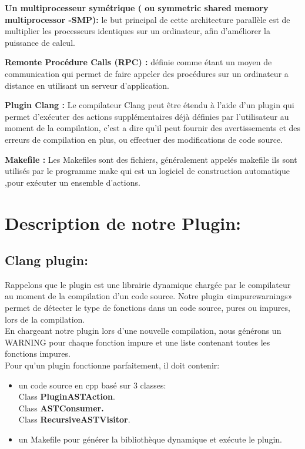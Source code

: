 \documentclass[12pt,a4paper]{article}
\begin{document}
\textbf{ Un multiprocesseur symétrique ( ou symmetric shared memory multiprocessor -SMP): } 
le but principal de cette architecture parallèle  est de multiplier les processeurs identiques sur un ordinateur, afin d’améliorer  la puissance de calcul.\cite{wiki}

\textbf{ Remonte Procédure Calls (RPC) : } définie comme étant un moyen de communication qui permet de faire appeler des procédures sur un ordinateur a distance en utilisant un serveur d'application.\cite{wiki}

\textbf{Plugin Clang :} Le compilateur Clang peut être étendu à l'aide d'un plugin qui permet d'exécuter des actions supplémentaires déjà définies par l'utilisateur au moment de la compilation\cite{ClangTeam}, c'est a dire qu'il peut fournir des avertissements et des erreurs de compilation en plus, ou effectuer des modifications de code source.\cite{clang}

\textbf{Makefile :} Les Makefiles sont des fichiers, généralement appelés makefile ils sont utilisés par le programme make qui est un logiciel de construction automatique ,pour exécuter un ensemble d'actions.\cite{makefile}
\section{Description de notre Plugin:}

\subsection{Clang plugin:}

Rappelons que le plugin est une librairie dynamique chargée par le compilateur au moment de la compilation d’un code source.
Notre plugin «impurewarnings»  permet de détecter le type de fonctions dans un code source, pures ou impures, lors de la compilation. \\
En chargeant notre plugin lors d’une nouvelle compilation, nous générons un WARNING pour chaque fonction impure  et une liste contenant toutes les fonctions impures.\\

Pour qu'un plugin fonctionne parfaitement, il doit contenir: 
\begin{itemize}
    \item un code source en cpp basé sur 3 classes:\\
	 Class \textbf{PluginASTAction}.\\
	 Class  \textbf{ASTConsumer.}\\
	 Class \textbf{RecursiveASTVisitor}.
\item un Makefile  pour générer la bibliothèque dynamique et exécute le plugin.
\end{itemize}
\end{document}
